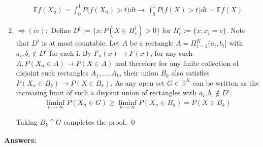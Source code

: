 \documentclass[10pt]{article}
\begin{document}
\begin{enumerate}[label=\textit{(\roman*)}]
    \begin{gather*}
        \mathbb{E}f(X_n) = \int_{0}^{1}P\big(f(X_n) > t\big) dt \to \int_{0}^{1}P\big(f(X) > t\big) dt = \mathbb{E}f(X)
    \end{gather*}

    \newpage
    \item $\Longrightarrow (iv):$ Define $D^i := \{x : P(X \in H_c^i) > 0\}$ for $H_c^i := \{x : x_i = c\}$. Note that $D^i$ is at most countable. Let $A$ be a rectangle $A = \Pi_{i = 1}^K (a_i, b_i]$ with $a_i, b_i \notin D^i$ for each i. By $F_n(x) \to F(x)$, for any such $A, P(X_n \in A) \to P(X \in A)$ and therefore for any finite collection of disjoint such rectangles $A_1, …, A_k$, their union $B_k$ also satisfies $P(X_n \in B_k) \to P(X \in B_k)$. As any open set $G \in \mathbb{R}^K$ can be written as the increasing limit of such a disjoint union of rectangles with $a_i, b_i \notin D^i$,
    \begin{gather*}
        \liminf_{n \to \infty}P(X_n \in G) \geq \liminf_{n \to \infty}P(X_n \in B_k) = P(X \in B_k)
    \end{gather*}

    Taking $B_k \uparrow G$ completes the proof. \qed

\end{enumerate}

\textbf{Answers: }
\end{document}
